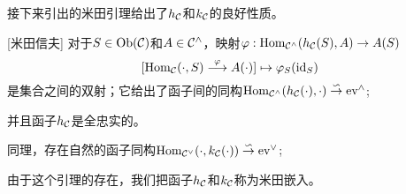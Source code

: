     接下来引出的米田引理给出了$h_{\mathcal{C}}$和$k_{\mathcal{C}}$的良好性质。
    \begin{theorem}{}[米田信夫]
        对于$S\in \text{Ob}(\mathcal{C})$和$A \in \mathcal{C}^{\wedge}$，映射$\varphi:\text{Hom}_{\mathcal{C}^{\wedge}}(h_{\mathcal{C}}(S),A)\to A(S)$
        $$
        [\mathrm{Hom}_{\mathcal{C}}(\cdot,S)\stackrel{\varphi}{\longrightarrow}A(\cdot)] \mapsto \varphi_S(\text{id}_S)
        $$
        是集合之间的双射；它给出了函子间的同构$\mathrm{Hom}_{\mathcal{C}^{\wedge}}(h_{\mathcal{C}}(\cdot),\cdot) \overset{\backsim}{\to} \text{ev}^{\wedge}$;
        
        并且函子$h_{\mathcal{C}}$是全忠实的。

        同理，存在自然的函子同构$\mathrm{Hom}_{\mathcal{C}^{\vee}}(\cdot,k_{\mathcal{C}}(\cdot)) \overset{\backsim}{\to} \text{ev}^{\vee}$;
    \end{theorem}
    由于这个引理的存在，我们把函子$h_{\mathcal{C}}$和$k_{\mathcal{C}}$称为米田嵌入。
